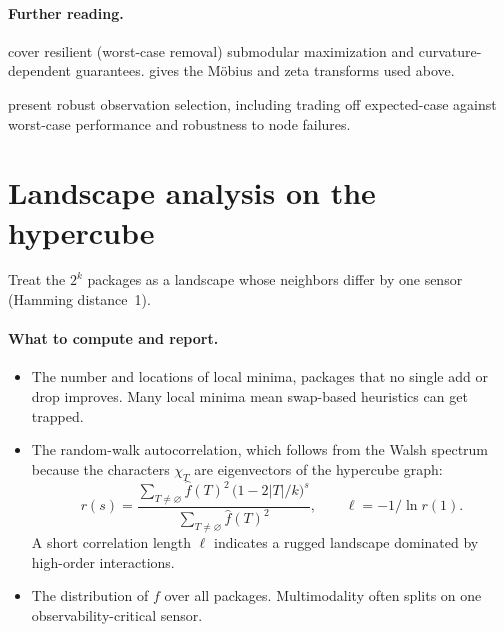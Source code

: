 \documentclass[11pt]{article}
\newcommand{\fh}{\widehat{f}}
\begin{document}
\paragraph{Further reading.}
\begin{reading}
  \item[Mathematics.] \textcite{Tzoumas2017} cover resilient (worst-case removal) submodular maximization and curvature-dependent guarantees.
        \textcite{Grabisch2016} gives the M\"obius and zeta transforms used above.
  \item[Applying it.] \textcite{KrauseRobust2008} present robust observation selection, including trading off expected-case against worst-case performance and robustness to node failures.
\end{reading}

\section{Landscape analysis on the hypercube}\label{sec:landscape}

Treat the $2^k$ packages as a landscape whose neighbors differ by one sensor (Hamming distance~1).

\paragraph{What to compute and report.}
\begin{itemize}[itemsep=2pt]
  \item The number and locations of local minima, packages that no single add or drop improves.
        Many local minima mean swap-based heuristics can get trapped.
  \item The random-walk autocorrelation, which follows from the Walsh spectrum because the characters $\chi_T$ are eigenvectors of the hypercube graph:
        \begin{equation}
          r(s)=\frac{\sum_{T\neq\varnothing}\fh(T)^2\,\bigl(1-2|T|/k\bigr)^{s}}{\sum_{T\neq\varnothing}\fh(T)^2},
          \qquad \ell=-1/\ln r(1).
        \end{equation}
        A short correlation length $\ell$ indicates a rugged landscape dominated by high-order interactions.
  \item The distribution of $f$ over all packages.
        Multimodality often splits on one observability-critical sensor.
\end{itemize}
\end{document}
